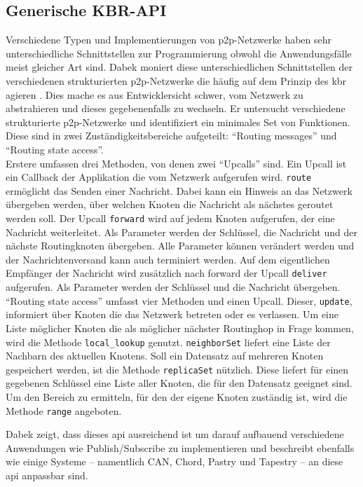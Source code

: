 \subsection{Generische KBR-API}
\label{chap:grundlagen:api}
Verschiedene Typen und Implementierungen von p2p-Netzwerke haben sehr unterschiedliche Schnittstellen zur Programmierung obwohl die Anwendungsfälle meist gleicher Art sind. Dabek moniert diese unterschiedlichen Schnittstellen der verschiedenen strukturierten p2p-Netzwerke die häufig auf dem Prinzip des \ac{kbr} agieren \cite{Dabek2003Towards}. Dies mache es aus Entwicklersicht schwer, vom Netzwerk zu abstrahieren und dieses gegebenenfalls zu wechseln. Er untersucht verschiedene strukturierte p2p-Netzwerke und identifiziert ein minimales Set von Funktionen. Diese sind in zwei Zuständigkeitsbereiche aufgeteilt: \enquote{Routing messages} und \enquote{Routing state access}.\\
Erstere umfassen drei Methoden, von denen zwei \enquote{Upcalls} sind. Ein Upcall ist ein Callback der Applikation die vom Netzwerk aufgerufen wird. \texttt{route} ermöglicht das Senden einer Nachricht. Dabei kann ein Hinweis an das Netzwerk übergeben werden, über welchen Knoten die Nachricht als nächstes geroutet werden soll. Der Upcall \texttt{forward} wird auf jedem Knoten aufgerufen, der eine Nachricht weiterleitet. Als Parameter werden der Schlüssel, die Nachricht und der nächste Routingknoten übergeben. Alle Parameter können verändert werden und der Nachrichtenversand kann auch terminiert werden. Auf dem eigentlichen Empfänger der Nachricht wird zusätzlich nach forward der Upcall \texttt{deliver} aufgerufen. Als Parameter werden der Schlüssel und die Nachricht übergeben.\\
\enquote{Routing state access} umfasst vier Methoden und einen Upcall. Dieser, \texttt{update}, informiert über Knoten die das Netzwerk betreten oder es verlassen. Um eine Liste möglicher Knoten die als möglicher nächster Routinghop in Frage kommen, wird die Methode \texttt{local\_lookup} genutzt. \texttt{neighborSet} liefert eine Liste der Nachbarn des aktuellen Knotens. Soll ein Datensatz auf mehreren Knoten gespeichert werden, ist die Methode \texttt{replicaSet} nützlich. Diese liefert für einen gegebenen Schlüssel eine Liste aller Knoten, die für den Datensatz geeignet sind. Um den Bereich zu ermitteln, für den der eigene Knoten zuständig ist, wird die Methode \texttt{range} angeboten.

Dabek zeigt, dass dieses \acf{api} ausreichend ist um darauf aufbauend verschiedene Anwendungen wie Publish/Subscribe zu implementieren und beschreibt ebenfalls wie einige Systeme -- namentlich CAN, Chord, Pastry und Tapestry -- an diese \ac{api} anpassbar sind.
